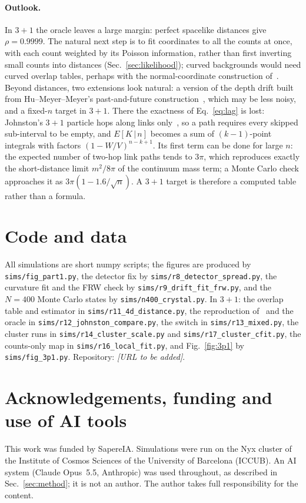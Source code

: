 \documentclass[11pt,a4paper]{article}
\begin{document}
\paragraph{Outlook.} In $3+1$ the oracle leaves a large margin: perfect spacelike distances give $\rho=0.9999$. The natural next step is to fit coordinates to all the counts at once, with each count weighted by its Poisson information, rather than first inverting small counts into distances (Sec.~\ref{sec:likelihood}); curved backgrounds would need curved overlap tables, perhaps with the normal-coordinate construction of~\cite{Madsen26}. Beyond distances, two extensions look natural: a version of the depth drift built from Hu--Meyer--Meyer's past-and-future construction~\cite{HMM25}, which may be less noisy, and a fixed-$n$ target in $3+1$. There the exactness of Eq.~\eqref{eq:lag} is lost: Johnston's $3+1$ particle hops along links only~\cite{Johnston08}, so a path requires every skipped sub-interval to be empty, and $E[K\,|\,n]$ becomes a sum of $(k-1)$-point integrals with factors $(1-W/V)^{n-k+1}$. Its first term can be done for large $n$: the expected number of two-hop link paths tends to $3\pi$, which reproduces exactly the short-distance limit $m^2/8\pi$ of the continuum mass term; a Monte Carlo check approaches it as $3\pi(1-1.6/\sqrt n)$. A $3+1$ target is therefore a computed table rather than a formula.

\section*{Code and data}
All simulations are short numpy scripts; the figures are produced by \texttt{sims/fig\_part1.py}, the detector fix by \texttt{sims/r8\_detector\_spread.py}, the curvature fit and the FRW check by \texttt{sims/r9\_drift\_fit\_frw.py}, and the $N=400$ Monte Carlo states by \texttt{sims/n400\_crystal.py}. In $3+1$: the overlap table and estimator in \texttt{sims/r11\_4d\_distance.py}, the reproduction of~\cite{Johnston25} and the oracle in \texttt{sims/r12\_johnston\_compare.py}, the switch in \texttt{sims/r13\_mixed.py}, the cluster runs in \texttt{sims/r14\_cluster\_scale.py} and \texttt{sims/r17\_cluster\_cfit.py}, the counts-only map in \texttt{sims/r16\_local\_fit.py}, and Fig.~\ref{fig:3p1} by \texttt{sims/fig\_3p1.py}. Repository: \textit{[URL to be added]}.

\section*{Acknowledgements, funding and use of AI tools}
This work was funded by SapereIA. Simulations were run on the Nyx cluster of the Institute of Cosmos Sciences of the University of Barcelona (ICCUB). An AI system (Claude Opus~5.5, Anthropic) was used throughout, as described in Sec.~\ref{sec:method}; it is not an author. The author takes full responsibility for the content.
\end{document}
